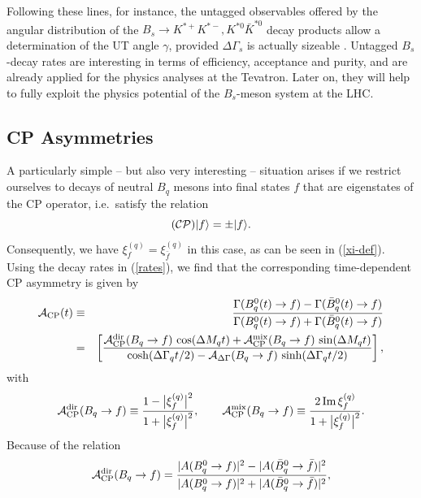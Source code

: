 \documentclass[11pt]{cernrep}
\begin{document}
Following these lines, for instance,  the untagged observables offered by 
the angular distribution of the $B_s\to K^{*+}K^{*-}, K^{*0}\bar K^{*0}$ decay 
products allow a determination of the UT angle $\gamma$, 
provided $\Delta\Gamma_s$ is 
actually sizeable \cite{FD-CP}. Untagged $B_s$-decay rates are interesting in 
terms of efficiency, acceptance and purity, and are already applied for the physics
analyses at the Tevatron. Later on, they will help to fully exploit the physics 
potential of the $B_s$-meson system at the LHC. 

 


%
%
%
\subsection{CP Asymmetries}\label{subsec:CPasym}
%
%
%
A particularly simple -- but also very interesting  -- situation arises 
if we restrict ourselves to decays of neutral $B_q$ mesons 
into final states $f$ that are eigenstates of the CP operator, i.e.\
satisfy the relation 
\begin{equation}\label{CP-eigen}
({\cal CP})|f\rangle=\pm |f\rangle. 
\end{equation}
Consequently, we have $\xi_f^{(q)}=\xi_{\bar f}^{(q)}$ in this case, 
as can be seen in (\ref{xi-def}). Using the decay rates in (\ref{rates}), 
we find that the corresponding time-dependent CP asymmetry is given by
\begin{eqnarray}
{\cal A}_{\rm CP}(t)&\equiv&\frac{\Gamma(B^0_q(t)\to f)-
\Gamma(\bar B^0_q(t)\to f)}{\Gamma(B^0_q(t)\to f)+
\Gamma(\bar B^0_q(t)\to f)}\nonumber\\
&=&\left[\frac{{\cal A}_{\rm CP}^{\rm dir}(B_q\to f)\,\cos(\Delta M_q t)+
{\cal A}_{\rm CP}^{\rm mix}(B_q\to f)\,\sin(\Delta 
M_q t)}{\cosh(\Delta\Gamma_qt/2)-{\cal A}_{\rm 
\Delta\Gamma}(B_q\to f)\,\sinh(\Delta\Gamma_qt/2)}\right],\label{ee6}
\end{eqnarray}
with
\begin{equation}\label{CPV-OBS}
{\cal A}^{\mbox{{\scriptsize dir}}}_{\mbox{{\scriptsize CP}}}(B_q\to f)\equiv
\frac{1-\bigl|\xi_f^{(q)}\bigr|^2}{1+\bigl|\xi_f^{(q)}\bigr|^2},\qquad
{\cal A}^{\mbox{{\scriptsize mix}}}_{\mbox{{\scriptsize
CP}}}(B_q\to f)\equiv\frac{2\,\mbox{Im}\,\xi^{(q)}_f}{1+
\bigl|\xi^{(q)}_f\bigr|^2}.
\end{equation}
Because of the relation
\begin{equation}
{\cal A}^{\mbox{{\scriptsize dir}}}_{\mbox{{\scriptsize CP}}}(B_q\to f)=
\frac{|A(B^0_q\to f)|^2-|A(\bar B^0_q\to \bar f)|^2}{|A(B^0_q\to f)|^2+
|A(\bar B^0_q\to \bar f)|^2},
\end{equation}
\end{document}
